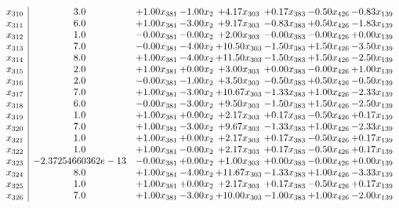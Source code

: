 \documentclass[8pt]{article}
\begin{document}
\[\begin{array}{c| c c@{\hskip 2pt} c@{\hskip 2pt} c@{\hskip 2pt} c@{\hskip 2pt} c@{\hskip 2pt} c@{\hskip 2pt} }
 x_{310}   &  3.0 & +  1.00 x_{381} & -1.00 x_{2} & +  4.17 x_{303} & +  0.17 x_{383} & -0.50 x_{426} & -0.83 x_{139}\\
 x_{311}   &  6.0 & +  1.00 x_{381} & -3.00 x_{2} & +  9.17 x_{303} & -0.83 x_{383} & +  0.50 x_{426} & -1.83 x_{139}\\
 x_{312}   &  1.0 & -0.00 x_{381} & -0.00 x_{2} & +  2.00 x_{303} & -0.00 x_{383} & -0.00 x_{426} & +  0.00 x_{139}\\
 x_{313}   &  7.0 & -0.00 x_{381} & -4.00 x_{2} & + 10.50 x_{303} & -1.50 x_{383} & +  1.50 x_{426} & -3.50 x_{139}\\
 x_{314}   &  8.0 & +  1.00 x_{381} & -4.00 x_{2} & + 11.50 x_{303} & -1.50 x_{383} & +  1.50 x_{426} & -2.50 x_{139}\\
 x_{315}   &  2.0 & +  1.00 x_{381} & +  0.00 x_{2} & +  3.00 x_{303} & +  0.00 x_{383} & -0.00 x_{426} & +  1.00 x_{139}\\
 x_{316}   &  2.0 & -0.00 x_{381} & -1.00 x_{2} & +  3.50 x_{303} & -0.50 x_{383} & +  0.50 x_{426} & -0.50 x_{139}\\
 x_{317}   &  7.0 & +  1.00 x_{381} & -3.00 x_{2} & + 10.67 x_{303} & -1.33 x_{383} & +  1.00 x_{426} & -2.33 x_{139}\\
 x_{318}   &  6.0 & -0.00 x_{381} & -3.00 x_{2} & +  9.50 x_{303} & -1.50 x_{383} & +  1.50 x_{426} & -2.50 x_{139}\\
 x_{319}   &  1.0 & +  1.00 x_{381} & +  0.00 x_{2} & +  2.17 x_{303} & +  0.17 x_{383} & -0.50 x_{426} & +  0.17 x_{139}\\
 x_{320}   &  7.0 & +  1.00 x_{381} & -3.00 x_{2} & +  9.67 x_{303} & -1.33 x_{383} & +  1.00 x_{426} & -2.33 x_{139}\\
 x_{321}   &  1.0 & +  1.00 x_{381} & +  0.00 x_{2} & +  2.17 x_{303} & +  0.17 x_{383} & -0.50 x_{426} & +  0.17 x_{139}\\
 x_{322}   &  1.0 & +  1.00 x_{381} & -0.00 x_{2} & +  2.17 x_{303} & +  0.17 x_{383} & -0.50 x_{426} & +  0.17 x_{139}\\
 x_{323}   &  -2.37254660362e-13 & -0.00 x_{381} & +  0.00 x_{2} & +  1.00 x_{303} & +  0.00 x_{383} & -0.00 x_{426} & +  0.00 x_{139}\\
 x_{324}   &  8.0 & +  1.00 x_{381} & -4.00 x_{2} & + 11.67 x_{303} & -1.33 x_{383} & +  1.00 x_{426} & -3.33 x_{139}\\
 x_{325}   &  1.0 & +  1.00 x_{381} & +  0.00 x_{2} & +  2.17 x_{303} & +  0.17 x_{383} & -0.50 x_{426} & +  0.17 x_{139}\\
 x_{326}   &  7.0 & +  1.00 x_{381} & -3.00 x_{2} & + 10.00 x_{303} & -1.00 x_{383} & +  1.00 x_{426} & -2.00 x_{139}\\

\end{array}\]
\end{document}

